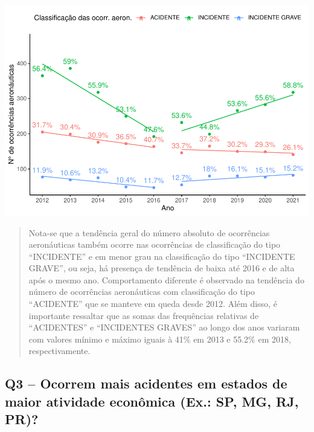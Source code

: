 \documentclass[
]{article}
\begin{document}
\begin{center}\includegraphics{4.Relatorio/pdf/index_files/figure-latex/unnamed-chunk-24-1} \end{center}

\begin{quote}
Nota-se que a tendência geral do número absoluto de ocorrências
aeronáuticas também ocorre nas ocorrências de classificação do tipo
``INCIDENTE'' e em menor grau na classificação do tipo ``INCIDENTE
GRAVE'', ou seja, há presença de tendência de baixa até 2016 e de alta
após o mesmo ano. Comportamento diferente é observado na tendência do
número de ocorrências aeronáuticas com classificação do tipo
``ACIDENTE'' que se manteve em queda desde 2012. Além disso, é
importante ressaltar que as somas das frequências relativas de
``ACIDENTES'' e ``INCIDENTES GRAVES'' ao longo dos anos variaram com
valores mínimo e máximo iguais à 41\% em 2013 e 55.2\% em 2018,
respectivamente.
\end{quote}

\hypertarget{q3-ocorrem-mais-acidentes-em-estados-de-maior-atividade-econuxf4mica-ex.-sp-mg-rj-pr}{%
\subsection{Q3 -- Ocorrem mais acidentes em estados de maior atividade
econômica (Ex.: SP, MG, RJ,
PR)?}\label{q3-ocorrem-mais-acidentes-em-estados-de-maior-atividade-econuxf4mica-ex.-sp-mg-rj-pr}}
\end{document}
